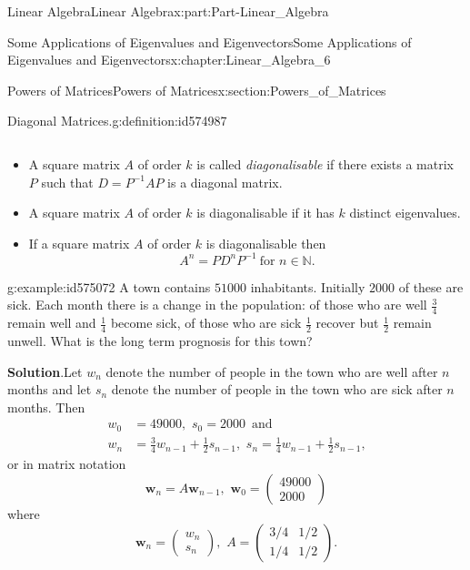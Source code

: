 \documentclass[oneside,10pt,]{book}
\newcommand{\blocktitlefont}{\relax}
\numberwithin{equation}{section}
\newcommand{\bm}[1]{\boldsymbol{#1}}
\newcommand{\amp}{&}
\begin{document}
\begin{partptx}{Linear Algebra}{}{Linear Algebra}{}{}{x:part:Part-Linear_Algebra}
\begin{chapterptx}{Some Applications of Eigenvalues and Eigenvectors}{}{Some Applications of Eigenvalues and Eigenvectors}{}{}{x:chapter:Linear_Algebra_6}
\begin{sectionptx}{Powers of Matrices}{}{Powers of Matrices}{}{}{x:section:Powers_of_Matrices}
\begin{definition}{Diagonal Matrices.}{g:definition:id574987}
\begin{itemize}[label=\textbullet]
\begin{equation*}
\end{equation*}
%
\item{}A  square  matrix  \(A\)  of  order  \(k\)  is  called  \emph{diagonalisable}  if  there  exists  a  matrix  \(P\) such that \(D = P^{-1} AP\) is a diagonal matrix.%
\item{}A square matrix \(A\) of order \(k\) is diagonalisable if it has \(k\) distinct eigenvalues.%
\item{}If a square matrix \(A\) of order \(k\) is diagonalisable then%
\begin{equation*}
A^n = PD^n P^{-1} \: \text{for } n \in \mathbb{N}\text{.}
\end{equation*}
%
\end{itemize}
%
\end{definition}
\begin{example}{}{g:example:id575072}%
A town contains \(51000\) inhabitants. Initially \(2000\) of these are sick. Each month there is a change in the population: of those who are well \(\frac{3}{4}\) remain well and \(\frac{1}{4}\) become sick, of those who are sick \(\frac{1}{2}\) recover but \(\frac{1}{2}\) remain unwell. What is the long term prognosis for this town?%
\par\smallskip%
\noindent\textbf{\blocktitlefont Solution}.\hypertarget{g:solution:id572895}{}\quad{}Let \(w_n\) denote the number of people in the town who are well after \(n\) months and let \(s_n\) denote the number of people in the town who are sick after \(n\) months. Then%
\begin{align*}
w_0 \amp = 49000, \, \, s_0 = 2000 \, \text{ and}\\
w_n \amp = \frac{3}{4}w_{n-1} + \frac{1}{2} s_{n-1}, \, \, s_n = \frac{1}{4} w_{n-1} + \frac{1}{2} s_{n-1}\text{,}
\end{align*}
or in matrix notation%
\begin{equation*}
\bm{w}_n = A \bm{w}_{n-1}, \, \, \bm{w}_0 = \begin{pmatrix} 49000 \\ 2000 \end{pmatrix}
\end{equation*}
where%
\begin{equation*}
\bm{w}_n = \begin{pmatrix} w_n \\ s_n \end{pmatrix}, \, \, A = \begin{pmatrix} 3/4 \amp 1/2 \\ 1/4 \amp 1/2 \end{pmatrix}\text{.}

\end{equation*}
\end{example}
\end{sectionptx}
\end{chapterptx}
\end{partptx}
\end{document}
